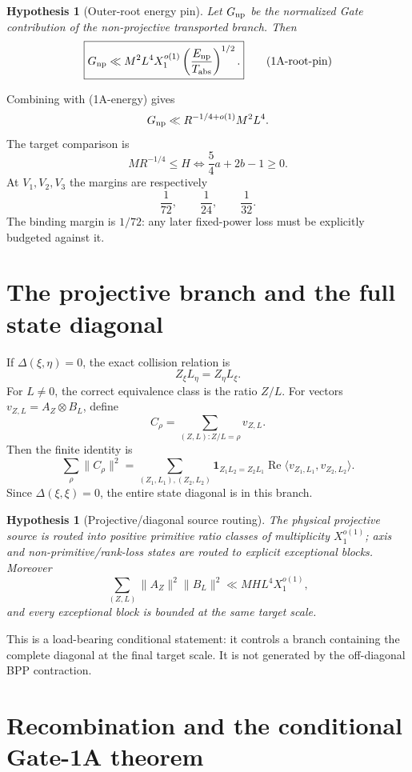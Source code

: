 \documentclass[11pt]{article}
\newtheorem{hypothesis}[theorem]{Hypothesis}
\theoremstyle{definition}
\theoremstyle{remark}
\newcommand{\1}{\mathbf 1}
\begin{document}
\begin{hypothesis}[Outer-root energy pin]\label{hyp:rootpin}
Let $G_{\rm np}$ be the normalized Gate contribution of the non-projective transported branch.  Then
\[
 \boxed{G_{\rm np}\ll M^2L^4X_1^{o(1)}
 \left(\frac{E_{\rm np}}{T_{\rm abs}}\right)^{1/2}.}
\tag{1A-root-pin}
\]
\end{hypothesis}

Combining with (1A-energy) gives
\[
 G_{\rm np}\ll R^{-1/4+o(1)}M^2L^4.
\]
The target comparison is
\[
 MR^{-1/4}\le H
 \iff \frac54a+2b-1\ge0.
\]
At $V_1,V_2,V_3$ the margins are respectively
\[
 \boxed{\frac1{72},\qquad\frac1{24},\qquad\frac1{32}.}
\tag{1A-margins}
\]
The binding margin is $1/72$: any later fixed-power loss must be explicitly budgeted against it.

\section{The projective branch and the full state diagonal}

If $\Delta(\xi,\eta)=0$, the exact collision relation is
\[
 Z_\xi L_\eta=Z_\eta L_\xi.
\]
For $L\ne0$, the correct equivalence class is the ratio $Z/L$.  For vectors $v_{Z,L}=A_Z\otimes B_L$, define
\[
 C_\rho=\sum_{(Z,L):Z/L=\rho}v_{Z,L}.
\]
Then the finite identity is
\[
 \boxed{
 \sum_\rho\|C_\rho\|^2
 =\sum_{(Z_1,L_1),(Z_2,L_2)}
 \1_{Z_1L_2=Z_2L_1}
 \operatorname{Re}\langle v_{Z_1,L_1},v_{Z_2,L_2}\rangle.}
\tag{1A-proj-id}
\]
Since $\Delta(\xi,\xi)=0$, the entire state diagonal is in this branch.

\begin{hypothesis}[Projective/diagonal source routing]\label{hyp:proj}
The physical projective source is routed into positive primitive ratio classes of multiplicity $X_1^{o(1)}$;
axis and non-primitive/rank-loss states are routed to explicit exceptional blocks.  Moreover
\[
 \boxed{\sum_{(Z,L)}\|A_Z\|^2\|B_L\|^2\ll MHL^4X_1^{o(1)},}
\tag{1A-diag}
\]
and every exceptional block is bounded at the same target scale.
\end{hypothesis}

This is a load-bearing conditional statement: it controls a branch containing the complete diagonal at the
final target scale.  It is not generated by the off-diagonal BPP contraction.

\section{Recombination and the conditional Gate-1A theorem}
\end{document}
